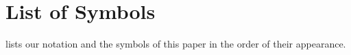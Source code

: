 \section{List of Symbols}\label{sec:ListOfSymbols}
 lists our notation and the symbols of this paper in the order of their appearance.

\begin{table}[t]
    \centering
    \small
    
    \caption{
        Our notation and the symbols of \cref{sec:InterpolationError}.
    }
    \label{tab:ListOfSymbols}
\end{table}
